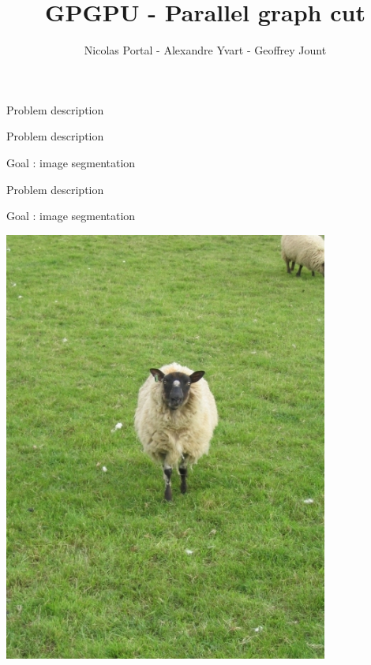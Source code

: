 \documentclass[10pt]{beamer}
\title{GPGPU - Parallel graph cut}
\author{Nicolas Portal - Alexandre Yvart - Geoffrey Jount}
\institute{EPITA}
\date{} %
\begin{document}
{
\frame{\titlepage}}



\begin{frame}{Problem description}
\end{frame}

\begin{frame}{Problem description}
\begin{center}
    Goal : image segmentation
\end{center}
\vspace{0.5cm}
    \begin{minipage}{0.5\textwidth}
    \end{minipage}%
    \begin{minipage}{0.5\textwidth}
    \end{minipage}
\end{frame}

\begin{frame}{Problem description}
\centering
\begin{center}
    Goal : image segmentation
\end{center}
\vspace{0.5cm}
    \begin{minipage}{.5\textwidth}
        \centering
        \includegraphics[width=0.8\textwidth]{input.jpg}
    \end{minipage}%
    \begin{minipage}{0.5\textwidth}
    \end{minipage}
\end{frame}
\end{document}
